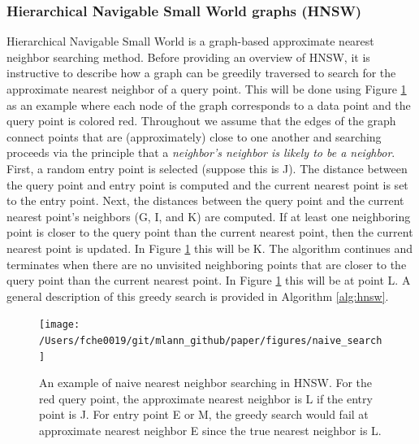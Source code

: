 \documentclass[11pt,a4paper,]{article}
\begin{document}
\hypertarget{hierarchical-navigable-small-world-graphs-hnsw}{%
\subsubsection*{Hierarchical Navigable Small World graphs (HNSW)}\label{hierarchical-navigable-small-world-graphs-hnsw}}

Hierarchical Navigable Small World \autocite{Malkov2020-jp} is a graph-based approximate nearest neighbor searching method. Before providing an overview of HNSW, it is instructive to describe how a graph can be greedily traversed to search for the approximate nearest neighbor of a query point. This will be done using Figure \ref{fig:naive} as an example where each node of the graph corresponds to a data point and the query point is colored red. Throughout we assume that the edges of the graph connect points that are (approximately) close to one another and searching proceeds via the principle that a \emph{neighbor's neighbor is likely to be a neighbor}. First, a random entry point is selected (suppose this is J). The distance between the query point and entry point is computed and the current nearest point is set to the entry point. Next, the distances between the query point and the current nearest point's neighbors (G, I, and K) are computed. If at least one neighboring point is closer to the query point than the current nearest point, then the current nearest point is updated. In Figure \ref{fig:naive} this will be K. The algorithm continues and terminates when there are no unvisited neighboring points that are closer to the query point than the current nearest point. In Figure \ref{fig:naive} this will be at point L. A general description of this greedy search is provided in Algorithm \ref{alg:hnsw}.

\begin{figure}

{\centering \texttt{[image: /Users/fche0019/git/mlann\_github/paper/figures/naive\_search]} 

}

\caption{An example of naive nearest neighbor searching in HNSW. For the red query point, the approximate nearest neighbor is L if the entry point is J. For entry point E or M, the greedy search would fail at approximate nearest neighbor E since the true nearest neighbor is L. }\label{fig:naive}
\end{figure}
\end{document}
